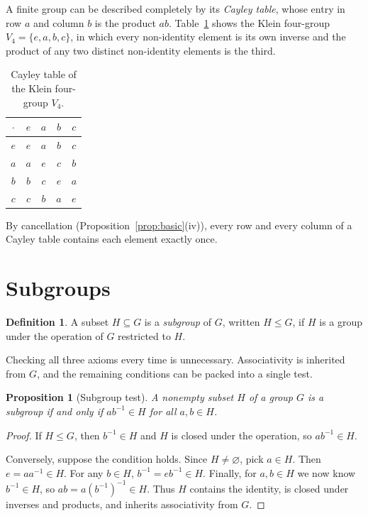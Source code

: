 \documentclass[11pt]{article}
\theoremstyle{plain}
\newtheorem{proposition}[theorem]{Proposition}
\theoremstyle{definition}
\newtheorem{definition}[theorem]{Definition}
\theoremstyle{remark}
\begin{document}
A finite group can be described completely by its \emph{Cayley table}, whose entry in row $a$ and column $b$ is the product $ab$. Table~\ref{tab:klein} shows the Klein four-group $V_4 = \{e, a, b, c\}$, in which every non-identity element is its own inverse and the product of any two distinct non-identity elements is the third.

\begin{table}[ht]
  \centering
  \begin{tabular}{c|cccc}
    $\cdot$ & $e$ & $a$ & $b$ & $c$ \\ \hline
    $e$ & $e$ & $a$ & $b$ & $c$ \\
    $a$ & $a$ & $e$ & $c$ & $b$ \\
    $b$ & $b$ & $c$ & $e$ & $a$ \\
    $c$ & $c$ & $b$ & $a$ & $e$
  \end{tabular}
  \caption{Cayley table of the Klein four-group $V_4$.}
  \label{tab:klein}
\end{table}

By cancellation (Proposition~\ref{prop:basic}(iv)), every row and every column of a Cayley table contains each element exactly once.

\section{Subgroups}

\begin{definition}
A subset $H \subseteq G$ is a \emph{subgroup} of $G$, written $H \le G$, if $H$ is a group under the operation of $G$ restricted to $H$.
\end{definition}

Checking all three axioms every time is unnecessary. Associativity is inherited from $G$, and the remaining conditions can be packed into a single test.

\begin{proposition}[Subgroup test]\label{prop:subgroup-test}
A nonempty subset $H$ of a group $G$ is a subgroup if and only if $ab^{-1} \in H$ for all $a, b \in H$.
\end{proposition}

\begin{proof}
If $H \le G$, then $b^{-1} \in H$ and $H$ is closed under the operation, so $ab^{-1} \in H$.

Conversely, suppose the condition holds. Since $H \neq \varnothing$, pick $a \in H$. Then $e = aa^{-1} \in H$. For any $b \in H$, $b^{-1} = eb^{-1} \in H$. Finally, for $a, b \in H$ we now know $b^{-1} \in H$, so $ab = a(b^{-1})^{-1} \in H$. Thus $H$ contains the identity, is closed under inverses and products, and inherits associativity from $G$.
\end{proof}
\end{document}
